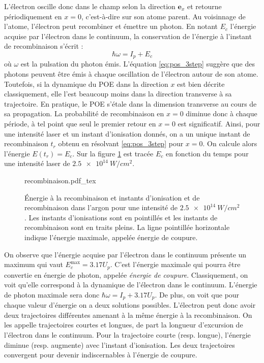 L'électron oscille donc dans le champ selon la direction $\bm{e}_x$ et retourne périodiquement en $x=0$, c'est-à-dire sur son atome parent. Au voisinnage de l'atome, l'électron peut recombiner et émettre un photon. En notant $E_c$ l'énergie acquise par l'électron dans le continuum, la conservation de l'énergie à l'instant de recombinaison s'écrit :
\begin{equation}
\hbar\omega = I_p+E_c
\end{equation}
où $\omega$ est la pulsation du photon émis. L'équation \ref{eq:pos_3step} suggère que des photons peuvent être émis à chaque oscillation de l'électron autour de son atome. Toutefois, si la dynamique du POE dans la direction $x$ est bien décrite classiquement, elle l'est beaucoup moins dans la direction transverse à sa trajectoire. En pratique, le POE s'étale dans la dimension transverse au cours de sa propagation. La probabilité de recombinaison en $x=0$ diminue donc à chaque période, à tel point que seul le premier retour en $x=0$ est significatif. Ainsi, pour une intensité laser et un instant d'ionisation donnés, on a un unique instant de recombinaison $t_r$ obtenu en résolvant \ref{eq:pos_3step} pour $x=0$. On calcule alors l'énergie $E(t_r) = E_c$. Sur la figure \ref{fig:recombinaison} est tracée $E_c$ en fonction du temps pour une intensité laser de $\SI{2.5e14}{W/cm^2}$.

\begin{figure}[!ht]
\centering
\def\svgwidth{\columnwidth}
{recombinaison.pdf_tex}
\caption{\'Energie à la recombinaison et instants d'ionisation et de recombinaison dans l'argon pour une intensité de $\SI{2.5e14}{W/cm^2}$. Les instants d'ionisations sont en pointillés et les instants de recombinaison sont en traits pleins. La ligne pointillée horizontale indique l'énergie maximale, appelée énergie de coupure.}
\label{fig:recombinaison}
\end{figure}

On observe que l'énergie acquise par l'électron dans le continuum présente un maximum qui vaut $E_c^{\text{max}} = 3.17 U_p$. C'est l'énergie maximale qui pourra être convertie en énergie de photon, appelée \textit{énergie de coupure}. Classiquement, on voit qu'elle correspond à la dynamique de l'électron dans le continuum. L'énergie de photon maximale sera donc $\hbar\omega = I_p+3.17 U_p$. De plus, on voit que pour chaque valeur d'énergie on a deux solutions possibles. L'électron peut donc avoir deux trajectoires différentes amenant à la même énergie à la recombinaison. On les appelle trajectoires courtes et longues, de part la longueur d'excursion de l'électron dans le continuum. Pour la trajectoire courte (resp. longue), l'énergie diminue (resp. augmente) avec l'instant d'ionisation. Les deux trajectoires convergent pour devenir indiscernables à l'énergie de coupure.

